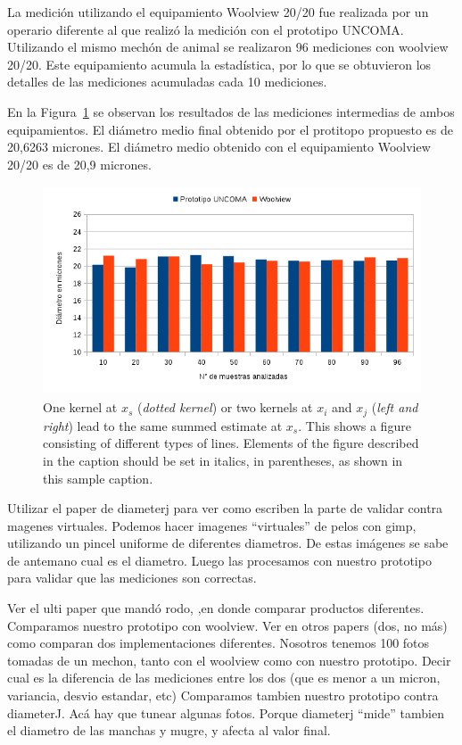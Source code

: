 \documentclass[runningheads,a4paper]{llncs}
\begin{document}
La medición utilizando el equipamiento Woolview 20/20 fue realizada por un operario diferente al que realizó la medición con el prototipo UNCOMA. Utilizando el mismo mechón de animal se realizaron 96 mediciones con woolview 20/20. Este equipamiento acumula la estadística, por lo que se obtuvieron los detalles de las mediciones acumuladas cada 10 mediciones. 

En la Figura~\ref{fig:prototipovswv} se observan los resultados de las mediciones intermedias de ambos equipamientos.
El diámetro medio final obtenido por el protitopo propuesto es de 20,6263 micrones. El diámetro medio obtenido con el equipamiento Woolview 20/20 es de 20,9 micrones.

\begin{figure}
\centering
\includegraphics[height=6.2cm]{prototipovswv}
\caption{One kernel at $x_s$ (\emph{dotted kernel}) or two kernels at
$x_i$ and $x_j$ (\textit{left and right}) lead to the same summed estimate
at $x_s$. This shows a figure consisting of different types of
lines. Elements of the figure described in the caption should be set in
italics, in parentheses, as shown in this sample caption.}
\label{fig:prototipovswv}
\end{figure}

Utilizar el paper de diameterj para ver como escriben la parte de validar contra magenes virtuales. Podemos hacer imagenes “virtuales” de pelos con gimp, utilizando un pincel uniforme de diferentes diametros. De estas imágenes se sabe de antemano cual es el diametro. Luego las procesamos con nuestro prototipo para validar que las mediciones son correctas.


Ver el ulti paper que mandó rodo, ,en donde comparar productos diferentes. Comparamos nuestro prototipo con woolview. Ver en otros papers (dos, no más) como comparan dos implementaciones diferentes.
Nosotros tenemos 100 fotos tomadas de un mechon, tanto con el woolview como con nuestro prototipo. Decir cual es la diferencia de las mediciones entre los dos (que es menor a un micron, variancia, desvio estandar, etc)
Comparamos tambien nuestro prototipo contra diameterJ. Acá hay que tunear algunas fotos. Porque diameterj “mide” tambien el diametro de las manchas y mugre, y afecta al valor final.
\end{document}
